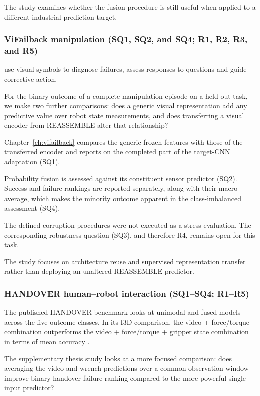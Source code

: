 The study examines whether the fusion procedure is still useful when applied to a different
industrial prediction target.

\subsubsection*{ViFailback manipulation (SQ1, SQ2, and SQ4; R1, R2, R3, and R5)}

\textcite[Tables~2--4]{Zeng2026ViFailback} use visual symbols to diagnose failures, assess responses to questions and guide
corrective action.

For the binary outcome of a complete manipulation episode on a held-out task, we make two further
comparisons: does a generic visual representation add any predictive value over robot state
measurements, and does transferring a visual encoder from REASSEMBLE alter that relationship?

Chapter~\ref{ch:vifailback} compares the generic frozen features with those of the transferred
encoder and reports on the completed part of the target-CNN adaptation (SQ1).

Probability fusion is assessed against its constituent sensor predictor (SQ2). Success and failure
rankings are reported separately, along with their macro-average, which makes the minority outcome
apparent in the class-imbalanced assessment (SQ4).

The defined corruption procedures were not executed as a stress evaluation. The corresponding
robustness question (SQ3), and therefore R4, remains open for this task.

The study focuses on architecture reuse and supervised representation transfer rather than deploying
an unaltered REASSEMBLE predictor.

\subsubsection*{HANDOVER human--robot interaction (SQ1--SQ4; R1--R5)}

The published HANDOVER benchmark looks at unimodal and fused models across the five outcome classes.
In its I3D comparison, the video + force/torque combination outperforms the video + force/torque +
gripper state combination in terms of mean accuracy \parencite[PDF p.~7,
Table~III]{Thoduka2024Handover}.

The supplementary thesis study looks at a more focused comparison: does averaging the video and
wrench predictions over a common observation window improve binary handover failure ranking compared
to the more powerful single-input predictor?

